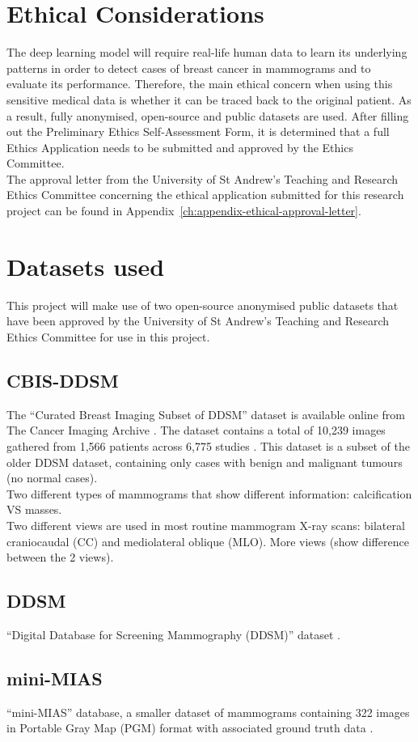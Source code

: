 \section{Ethical Considerations}

The deep learning model will require real-life human data to learn its underlying patterns in order to detect cases of breast cancer in mammograms and to evaluate its performance. Therefore, the main ethical concern when using this sensitive medical data is whether it can be traced back to the original patient. As a result, fully anonymised, open-source and public datasets are used. After filling out the Preliminary Ethics Self-Assessment Form, it is determined that a full Ethics Application needs to be submitted and approved by the Ethics Committee.\\

The approval letter from the University of St Andrew's Teaching and Research Ethics Committee concerning the ethical application submitted for this research project can be found in Appendix~\ref{ch:appendix-ethical-approval-letter}.


\section{Datasets used}

This project will make use of two open-source anonymised public datasets that have been approved by the University of St Andrew's Teaching and Research Ethics Committee for use in this project.

\subsection{CBIS-DDSM}

The ``Curated Breast Imaging Subset of DDSM'' dataset \cite{Lee2017} is available online from The Cancer Imaging Archive \cite{Clark2013}. The dataset contains a total of 10,239 images gathered from 1,566 patients across 6,775 studies \cite{Lee2017}. This dataset is a subset of the older DDSM dataset, containing only cases with benign and malignant tumours (no normal cases).\\

Two different types of mammograms that show different information: calcification VS masses.\\

Two different views are used in most routine mammogram X-ray scans: bilateral craniocaudal (CC) and mediolateral oblique (MLO). More views 
(show difference between the 2 views).

\subsection{DDSM}

``Digital Database for Screening Mammography (DDSM)'' dataset \cite{DDSMdataset2001}.

\subsection{mini-MIAS}

``mini-MIAS'' database, a smaller dataset of mammograms containing 322 images in Portable Gray Map (PGM) format with associated ground truth data \cite{Suckling1994}.